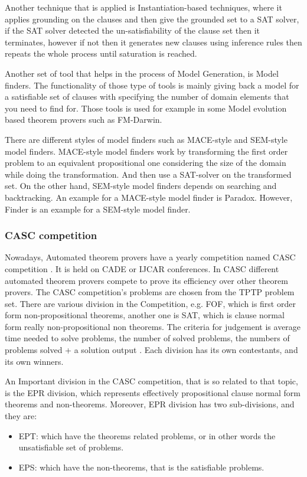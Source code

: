 Another technique that is applied is Instantiation-based techniques, where it applies grounding on the clauses and then give the grounded set to a SAT solver, if the SAT solver detected the un-satisfiability of the clause set then it terminates, however if not then it generates new clauses using inference rules then repeats the whole process until saturation is reached.


Another set of tool that helps in the process of Model Generation, is Model finders. The functionality of those type of tools is mainly giving back a model for a satisfiable set of clauses with specifying the number of domain elements that you need to find for. Those tools is used for example in some Model evolution based theorem provers such as FM-Darwin.


There are different styles of model finders such as MACE-style and SEM-style model finders. MACE-style model finders work by transforming the first order problem to an equivalent propositional one considering the size of the domain while doing the transformation. And then use a SAT-solver on the transformed set. On the other hand, SEM-style model finders depends on searching and backtracking. An example for a MACE-style model finder is Paradox. However, Finder is an example for a SEM-style model finder. \cite{MODEL_FINDER}      


\subsubsection{CASC competition}
Nowadays, Automated theorem provers have a yearly competition named CASC competition \cite{CASC02,CASC06}. It is held on CADE or IJCAR conferences. In CASC different automated theorem provers compete to prove its efficiency over other theorem provers. The CASC competition's problems are chosen from the TPTP problem set. There are various division in the Competition, e.g. FOF, which is first order form non-propositional theorems, another one is SAT, which is clause normal form really non-propositional non theorems.
The criteria for judgement is average time needed to solve problems, the number of solved problems, the numbers of problems solved + a solution output . Each division has its own contestants, and its own winners.


An Important division in the CASC competition, that is so related to that topic, is the EPR division, which represents effectively propositional clause normal form theorems and non-theorems. Moreover, EPR division has two sub-divisions, and they are:
	\begin{itemize}
		\item EPT: which have the theorems related problems, or in other words the unsatisfiable set of problems.
		\item EPS: which have the non-theorems, that is the satisfiable problems.
	\end{itemize}
	

